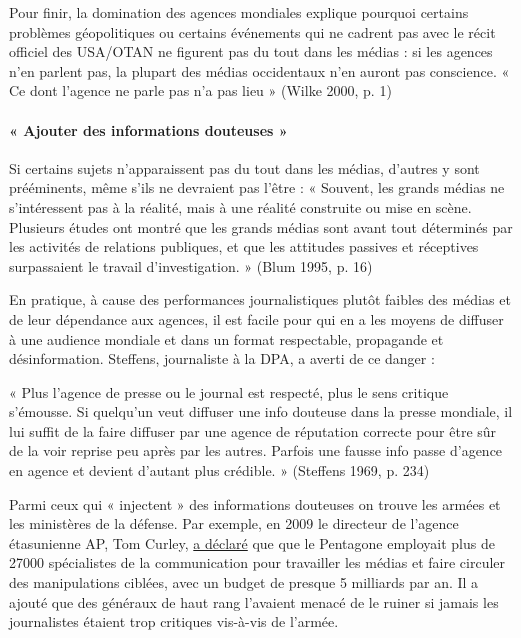 Pour finir, la domination des agences mondiales explique pourquoi
certains problèmes géopolitiques ou certains événements qui ne cadrent
pas avec le récit officiel des USA/OTAN ne figurent pas du tout dans les
médias : si les agences n'en parlent pas, la plupart des médias
occidentaux n'en auront pas conscience. « Ce dont l'agence ne parle pas
n'a pas lieu » (Wilke 2000, p. 1)

\hypertarget{-ajouter-des-informations-douteuses-}{%
\paragraph{« Ajouter des informations douteuses
»}\label{-ajouter-des-informations-douteuses-}}

Si certains sujets n'apparaissent pas du tout dans les médias, d'autres
y sont prééminents, même s'ils ne devraient pas l'être : « Souvent, les
grands médias ne s'intéressent pas à la réalité, mais à une réalité
construite ou mise en scène. Plusieurs études ont montré que les grands
médias sont avant tout déterminés par les activités de relations
publiques, et que les attitudes passives et réceptives surpassaient le
travail d'investigation. » (Blum 1995, p. 16)

En pratique, à cause des performances journalistiques plutôt faibles des
médias et de leur dépendance aux agences, il est facile pour qui en a
les moyens de diffuser à une audience mondiale et dans un format
respectable, propagande et désinformation. Steffens, journaliste à la
DPA, a averti de ce danger :

« Plus l'agence de presse ou le journal est respecté, plus le sens
critique s'émousse. Si quelqu'un veut diffuser une info douteuse dans la
presse mondiale, il lui suffit de la faire diffuser par une agence de
réputation correcte pour être sûr de la voir reprise peu après par les
autres. Parfois une fausse info passe d'agence en agence et devient
d'autant plus crédible. » (Steffens 1969, p. 234)

Parmi ceux qui « injectent » des informations douteuses on trouve les
armées et les ministères de la défense. Par exemple, en 2009 le
directeur de l'agence étasunienne AP, Tom Curley,
\href{https://harpers.org/blog/2009/02/pentagon-targeted-and-mistreated-journalists-ap-head-charges/}{a
déclaré} que que le Pentagone employait plus de 27000 spécialistes de la
communication pour travailler les médias et faire circuler des
manipulations ciblées, avec un budget de presque 5 milliards par an. Il
a ajouté que des généraux de haut rang l'avaient menacé de le ruiner si
jamais les journalistes étaient trop critiques vis-à-vis de l'armée.

